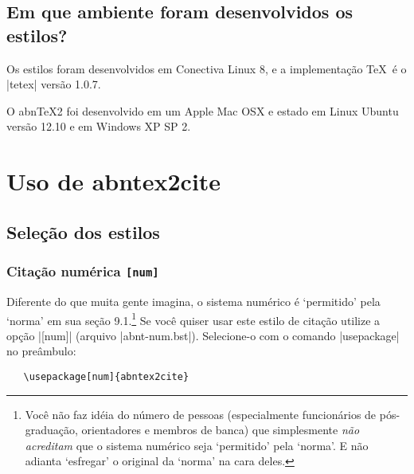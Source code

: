 \documentclass[a4paper]{ltxdoc}
\newcommand{\abnTeX}{abn\TeX}
\begin{document}

\subsection{Em que ambiente foram desenvolvidos os estilos?}

Os estilos foram desenvolvidos em Conectiva Linux 8, e a implementação \TeX\ é
o |tetex| versão 1.0.7.

O \abnTeX2 foi desenvolvido em um Apple Mac OSX e estado em Linux Ubuntu
versão 12.10 e em Windows XP SP 2.

\section{Uso de \textsf{abntex2cite}}

\subsection{Seleção dos estilos}

\subsubsection{Citação numérica \tt{[num]}}

\DescribeMacro{\usepackage[num]{abntex2cite}}
Diferente do que muita gente imagina, o sistema numérico é `permitido'  pela
`norma'\cite{NBR6023:2000} em sua seção 9.1.\footnote{Você não faz idéia do
número de pessoas (especialmente funcionários de pós-graduação, orientadores e
membros de banca) que simplesmente \emph{não acreditam} que o sistema numérico
seja `permitido' pela `norma'. E não adianta `esfregar' o original da `norma' na
cara deles.} Se você quiser usar este estilo de citação utilize a opção |[num]|
(arquivo |abnt-num.bst|). Selecione-o com o comando |usepackage| no preâmbulo:

\begin{verbatim}
   \usepackage[num]{abntex2cite}
\end{verbatim}
\end{document}
